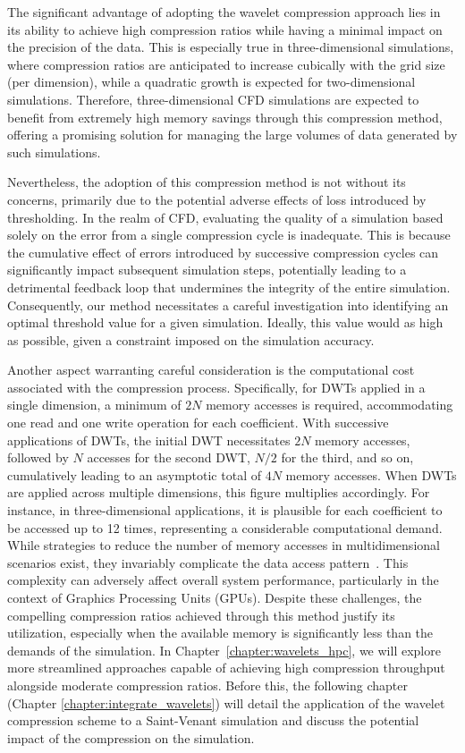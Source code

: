 The significant advantage of adopting the wavelet compression approach lies in its ability to achieve high compression ratios while having a minimal impact on the precision of the data.
This is especially true in three-dimensional simulations, where compression ratios are anticipated to increase cubically with the grid size (per dimension), while a quadratic growth is expected for two-dimensional simulations.
Therefore, three-dimensional CFD simulations are expected to benefit from extremely high memory savings through this compression method, offering a promising solution for managing the large volumes of data generated by such simulations.

Nevertheless, the adoption of this compression method is not without its concerns, primarily due to the potential adverse effects of loss introduced by thresholding.
In the realm of CFD, evaluating the quality of a simulation based solely on the error from a single compression cycle is inadequate.
This is because the cumulative effect of errors introduced by successive compression cycles can significantly impact subsequent simulation steps, potentially leading to a detrimental feedback loop that undermines the integrity of the entire simulation.
Consequently, our method necessitates a careful investigation into identifying an optimal threshold value for a given simulation.
Ideally, this value would as high as possible, given a constraint imposed on the simulation accuracy.

Another aspect warranting careful consideration is the computational cost associated with the compression process.
Specifically, for DWTs applied in a single dimension, a minimum of $2N$ memory accesses is required, accommodating one read and one write operation for each coefficient.
With successive applications of DWTs, the initial DWT necessitates $2N$ memory accesses, followed by $N$ accesses for the second DWT, $N/2$ for the third, and so on, cumulatively leading to an asymptotic total of $4N$ memory accesses.
When DWTs are applied across multiple dimensions, this figure multiplies accordingly.
For instance, in three-dimensional applications, it is plausible for each coefficient to be accessed up to 12 times, representing a considerable computational demand.
While strategies to reduce the number of memory accesses in multidimensional scenarios exist, they invariably complicate the data access pattern~\cite{taghavi2003memory,liao2004efficient}.
This complexity can adversely affect overall system performance, particularly in the context of Graphics Processing Units (GPUs).
Despite these challenges, the compelling compression ratios achieved through this method justify its utilization, especially when the available memory is significantly less than the demands of the simulation.
In Chapter~\ref{chapter:wavelets_hpc}, we will explore more streamlined approaches capable of achieving high compression throughput alongside moderate compression ratios.
Before this, the following chapter (Chapter \ref{chapter:integrate_wavelets}) will detail the application of the wavelet compression scheme to a Saint-Venant simulation and discuss the potential impact of the compression on the simulation.

